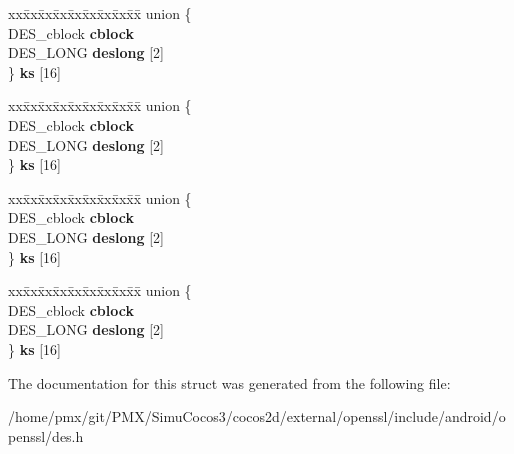 \begin{DoxyCompactItemize}
\begin{tabbing}
\end{tabbing}\item 
\mbox{\label{structDES__ks_a9af4af20b315c60051b4dbaa3a4633ea}} 
\begin{tabbing}
xx\=xx\=xx\=xx\=xx\=xx\=xx\=xx\=xx\=\kill
union \{\\
\>DES\_cblock {\bfseries cblock}\\
\>DES\_LONG {\bfseries deslong} \mbox{[}2\mbox{]}\\
\} {\bfseries ks} \mbox{[}16\mbox{]}\\

\end{tabbing}\item 
\mbox{\label{structDES__ks_a602b7c9054aab69de9a13afd036c46c1}} 
\begin{tabbing}
xx\=xx\=xx\=xx\=xx\=xx\=xx\=xx\=xx\=\kill
union \{\\
\>DES\_cblock {\bfseries cblock}\\
\>DES\_LONG {\bfseries deslong} \mbox{[}2\mbox{]}\\
\} {\bfseries ks} \mbox{[}16\mbox{]}\\

\end{tabbing}\item 
\mbox{\label{structDES__ks_a13b3b74a4df94eeec3435ba7991d6918}} 
\begin{tabbing}
xx\=xx\=xx\=xx\=xx\=xx\=xx\=xx\=xx\=\kill
union \{\\
\>DES\_cblock {\bfseries cblock}\\
\>DES\_LONG {\bfseries deslong} \mbox{[}2\mbox{]}\\
\} {\bfseries ks} \mbox{[}16\mbox{]}\\

\end{tabbing}\item 
\mbox{\label{structDES__ks_a8e6ea509501e2a1775d08520abc3e06f}} 
\begin{tabbing}
xx\=xx\=xx\=xx\=xx\=xx\=xx\=xx\=xx\=\kill
union \{\\
\>DES\_cblock {\bfseries cblock}\\
\>DES\_LONG {\bfseries deslong} \mbox{[}2\mbox{]}\\
\} {\bfseries ks} \mbox{[}16\mbox{]}\\

\end{tabbing}\end{DoxyCompactItemize}


The documentation for this struct was generated from the following file\+:\begin{DoxyCompactItemize}
\item 
/home/pmx/git/\+P\+M\+X/\+Simu\+Cocos3/cocos2d/external/openssl/include/android/openssl/des.\+h\end{DoxyCompactItemize}
